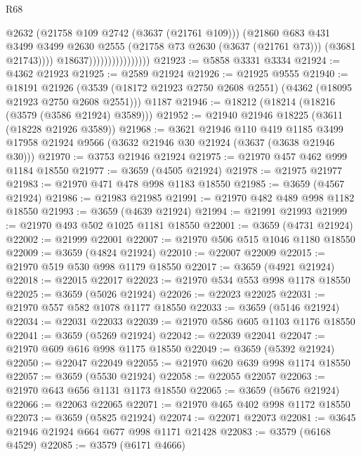 \begin{lexlean}{R68}
\begin{coremodule}
                                        @2632
                                        (@21758 @109 @2742 (@3637 (@21761 @109)))
                                        (@21860
                                          @683
                                          @431
                                          @3499
                                          @3499
                                          @2630
                                          @2555
                                          (@21758 @73 @2630 (@3637 (@21761 @73)))
                                          (@3681 @21743))))
                                    @18637))))))))))))))))
@21923 := @5858 @3331 @3334
@21924 := @4362 @21923
@21925 := @2589 @21924
@21926 := @21925 @9555
@21940 := @18191
    @21926
    (@3539 (@18172 @21923 @2750 @2608 @2551) (@4362 (@18095 @21923 @2750 @2608 @2551)))
    @1187
@21946 := @18212 (@18214 (@18216 (@3579 (@3586 @21924) @3589)))
@21952 := @21940 @21946 @18225 (@3611 (@18228 @21926 @3589))
@21968 := @3621
    @21946
    @110
    @419
    @1185
    @3499
    @17958
    @21924
    @9566
    (@3632 @21946 @30 @21924 (@3637 (@3638 @21946 @30)))
@21970 := @3753 @21946 @21924
@21975 := @21970 @457 @462 @999 @1184 @18550
@21977 := @3659 (@4505 @21924)
@21978 := @21975 @21977
@21983 := @21970 @471 @478 @998 @1183 @18550
@21985 := @3659 (@4567 @21924)
@21986 := @21983 @21985
@21991 := @21970 @482 @489 @998 @1182 @18550
@21993 := @3659 (@4639 @21924)
@21994 := @21991 @21993
@21999 := @21970 @493 @502 @1025 @1181 @18550
@22001 := @3659 (@4731 @21924)
@22002 := @21999 @22001
@22007 := @21970 @506 @515 @1046 @1180 @18550
@22009 := @3659 (@4824 @21924)
@22010 := @22007 @22009
@22015 := @21970 @519 @530 @998 @1179 @18550
@22017 := @3659 (@4921 @21924)
@22018 := @22015 @22017
@22023 := @21970 @534 @553 @998 @1178 @18550
@22025 := @3659 (@5026 @21924)
@22026 := @22023 @22025
@22031 := @21970 @557 @582 @1078 @1177 @18550
@22033 := @3659 (@5146 @21924)
@22034 := @22031 @22033
@22039 := @21970 @586 @605 @1103 @1176 @18550
@22041 := @3659 (@5269 @21924)
@22042 := @22039 @22041
@22047 := @21970 @609 @616 @998 @1175 @18550
@22049 := @3659 (@5392 @21924)
@22050 := @22047 @22049
@22055 := @21970 @620 @639 @998 @1174 @18550
@22057 := @3659 (@5530 @21924)
@22058 := @22055 @22057
@22063 := @21970 @643 @656 @1131 @1173 @18550
@22065 := @3659 (@5676 @21924)
@22066 := @22063 @22065
@22071 := @21970 @465 @402 @998 @1172 @18550
@22073 := @3659 (@5825 @21924)
@22074 := @22071 @22073
@22081 := @3645 @21946 @21924 @664 @677 @998 @1171 @21428
@22083 := @3579 (@6168 @4529)
@22085 := @3579 (@6171 @4666)

\end{coremodule}
\end{lexlean}
